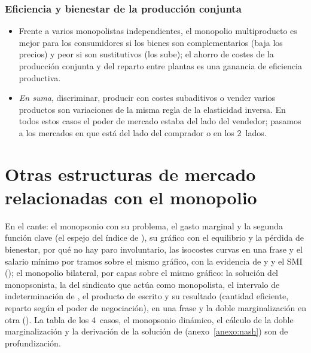 \documentclass[11pt]{article}
\begin{document}
\subsubsection{Eficiencia y bienestar de la producción conjunta}\label{sec:eficiencia-bienestar-produccion}

\begin{itemize}
\item Frente a varios monopolistas independientes, el monopolio multiproducto es mejor para los consumidores si los bienes son complementarios (baja los precios) y peor si son sustitutivos (los sube); el ahorro de costes de la producción conjunta y del reparto entre plantas es una ganancia de eficiencia productiva.
\item \emph{En suma}, discriminar, producir con costes subaditivos o vender varios productos son variaciones de la misma regla de la elasticidad inversa. En todos estos casos el poder de mercado estaba del lado del vendedor; pasamos a los mercados en que está del lado del comprador o en los 2~lados.
\end{itemize}

\section{Otras estructuras de mercado\cortetitulo{} relacionadas con el monopolio}\label{sec:otras-estructuras-mercado}

\begin{notaopositor}
En el cante: el monopsonio con su problema, el gasto marginal y la segunda función clave (el espejo del índice de ), su gráfico con el equilibrio y la pérdida de bienestar, por qué no hay paro involuntario, las isocostes curvas en una frase y el salario mínimo por tramos sobre el mismo gráfico, con la evidencia de  y  y el SMI (); el monopolio bilateral, por capas sobre el mismo gráfico: la solución del monopsonista, la del sindicato que actúa como monopolista, el intervalo de indeterminación de , el producto de  escrito y su resultado (cantidad eficiente, reparto según el poder de negociación),  en una frase y la doble marginalización en otra (). La tabla de los 4~casos, el monopsonio dinámico, el cálculo de la doble marginalización y la derivación de la solución de  (anexo~\ref{anexo:nash}) son de profundización.
\end{notaopositor}
\end{document}
